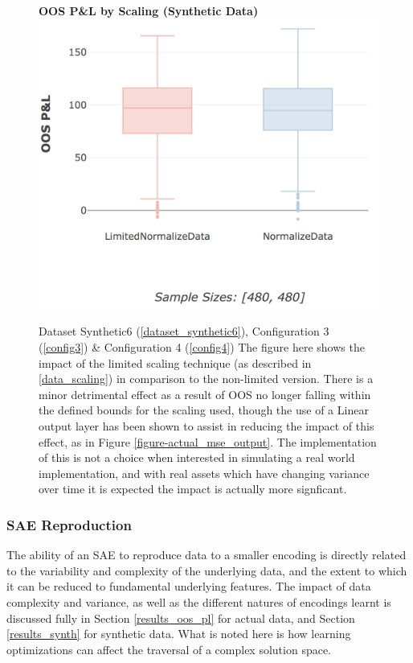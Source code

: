 \documentclass[a4paper,11pt,oneside]{article}
\theoremstyle{plain}
\theoremstyle{definition}
\begin{document}
	\begin{figure}[H]
		\centering
		\textbf{OOS P\&L by Scaling (Synthetic Data)} 
		\includegraphics[scale=0.34]{images/results/complexity/oos_scaling.png}
		\caption[OOS P\&L by Scaling (Synthetic Data)]{Dataset Synthetic6  (\ref{dataset_synthetic6}), Configuration 3 (\ref{config3}) \& Configuration 4 (\ref{config4})
				\newline The figure here shows the impact of the limited scaling technique (as described in \ref{data_scaling}) in comparison to the non-limited version. There is a minor detrimental effect as a result of OOS no longer falling within the defined bounds for the scaling used, though the use of a Linear output layer has been shown to assist in reducing the impact of this effect, as in Figure \ref{figure-actual_mse_output}. The implementation of this is not a choice when interested in simulating a real world implementation, and with real assets which have changing variance over time it is expected the impact is actually more signficant. }
		\label{figure-synth_pl_scaling}
	\end{figure}


	
	\subsubsection{SAE Reproduction}

	The ability of an SAE to reproduce data to a smaller encoding is directly related to the variability and complexity of the underlying data, and the extent to which it can be reduced to fundamental underlying features. The impact of data complexity and variance, as well as the different natures of encodings learnt is discussed fully in Section \ref{results_oos_pl} for actual data, and Section \ref{results_synth} for synthetic data. What is noted here is how learning optimizations can affect the traversal of a complex solution space. \newline
	
\end{document}
